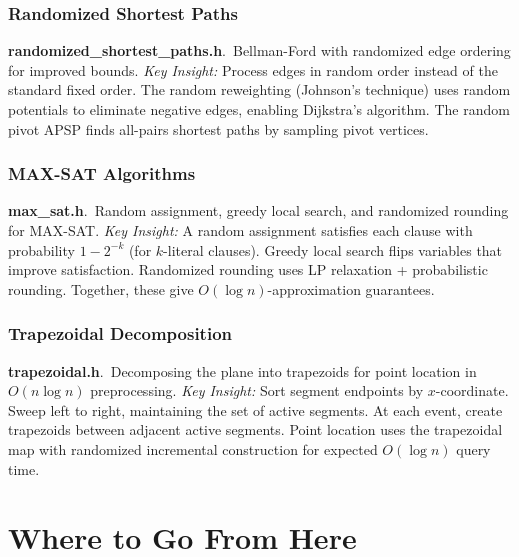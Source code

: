 \documentclass[11pt,a4paper]{article}
\newcommand{\algo}[2]{\textbf{#1}.\ #2}
\newcommand{\insight}{\textit{Key Insight: }}
\begin{document}
\subsubsection{Randomized Shortest Paths}
\algo{randomized\_shortest\_paths.h}{Bellman-Ford with randomized edge ordering for improved bounds.}
\insight Process edges in random order instead of the standard fixed order. The random reweighting (Johnson's technique) uses random potentials to eliminate negative edges, enabling Dijkstra's algorithm. The random pivot APSP finds all-pairs shortest paths by sampling pivot vertices.

\subsubsection{MAX-SAT Algorithms}
\algo{max\_sat.h}{Random assignment, greedy local search, and randomized rounding for MAX-SAT.}
\insight A random assignment satisfies each clause with probability \(1 - 2^{-k}\) (for \(k\)-literal clauses). Greedy local search flips variables that improve satisfaction. Randomized rounding uses LP relaxation + probabilistic rounding. Together, these give \(O(\log n)\)-approximation guarantees.

\subsubsection{Trapezoidal Decomposition}
\algo{trapezoidal.h}{Decomposing the plane into trapezoids for point location in \(O(n \log n)\) preprocessing.}
\insight Sort segment endpoints by \(x\)-coordinate. Sweep left to right, maintaining the set of active segments. At each event, create trapezoids between adjacent active segments. Point location uses the trapezoidal map with randomized incremental construction for expected \(O(\log n)\) query time.

\section{Where to Go From Here}
\end{document}
